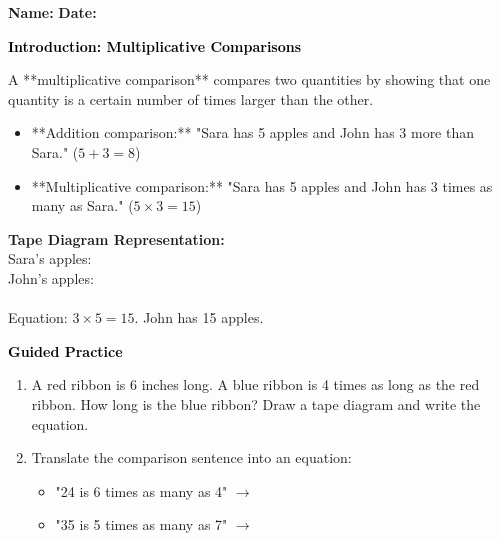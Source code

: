 \documentclass[12pt, letterpaper, fleqn]{article}
\newcommand{\blanklong}{\underline{\hspace{6.5cm}}}
\begin{document}
\textbf{Name:} \underline{\hspace{5cm}}
\hfill
\textbf{Date:} \underline{\hspace{3cm}}\\

\begin{tcolorbox}[colback=customteal!20]
    \large\textcolor{black}{\textbf{Introduction: Multiplicative Comparisons}}
\end{tcolorbox}

\vspace{3mm}
\noindent
A **multiplicative comparison** compares two quantities by showing that one quantity is a certain number of times larger than the other.
\begin{itemize}
    \item **Addition comparison:** "Sara has 5 apples and John has 3 more than Sara." ($5 + 3 = 8$)
    \item **Multiplicative comparison:** "Sara has 5 apples and John has 3 times as many as Sara." ($5 \times 3 = 15$)
\end{itemize}

\vspace{3mm}
\begin{tcolorbox}[colback=white, colframe=black!25, boxrule=0.6pt, arc=4mm]
\textbf{Tape Diagram Representation:}
\\
Sara's apples: 
\\
John's apples: 
\\ \\
Equation: $3 \times 5 = 15$. John has 15 apples.
\end{tcolorbox}

\newpage
\begin{tcolorbox}[colback=customteal!20]
    \large\textcolor{black}{\textbf{Guided Practice}}
\end{tcolorbox}

\vspace{5mm}
\begin{enumerate}[itemsep=3cm, leftmargin=0.6cm]
\item A red ribbon is 6 inches long. A blue ribbon is 4 times as long as the red ribbon. How long is the blue ribbon? Draw a tape diagram and write the equation.
\vspace{3cm}

\item Translate the comparison sentence into an equation:
  \begin{itemize}[itemsep=0.8cm]
    \item "24 is 6 times as many as 4" $\rightarrow$ \blanklong
    \item "35 is 5 times as many as 7" $\rightarrow$ \blanklong
  \end{itemize}
\end{enumerate}
\end{document}
